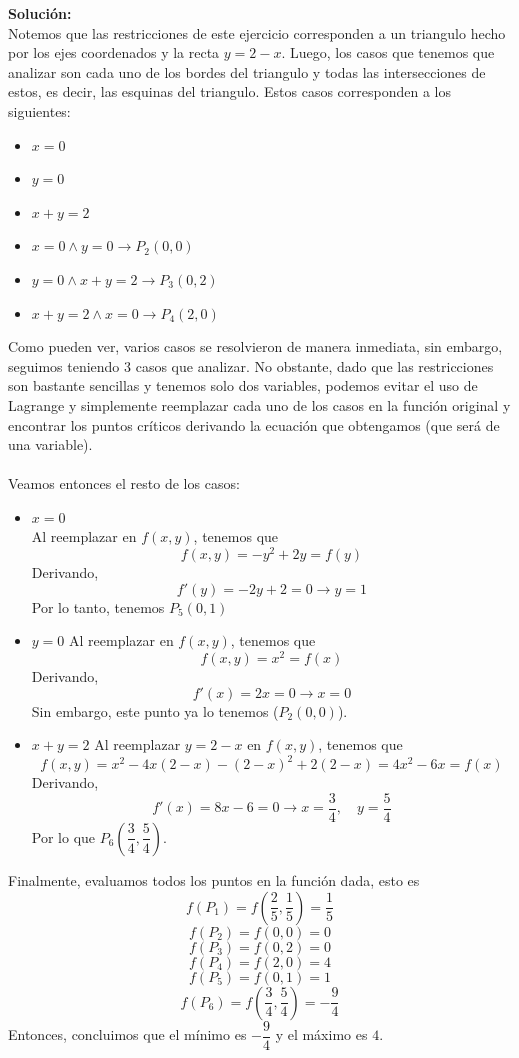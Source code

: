 \documentclass[12pt]{article}
\newenvironment{solucion}
{\begin{mdframed}[backgroundcolor=black!10]
		{\bf Solución:}\\
	}
	{
	\end{mdframed}
}
\newenvironment{preguntas}
{\begin{enumerate}\itemsep12pt
	}
	{
	\end{enumerate}
}
\newcommand{\ra}{\rightarrow}
\begin{document}
\begin{preguntas}
\begin{solucion}
Notemos que las restricciones de este ejercicio corresponden a un triangulo hecho por los ejes coordenados y la recta $y = 2-x$. Luego, los casos que tenemos que analizar son cada uno de los bordes del triangulo y todas las intersecciones de estos, es decir, las esquinas del triangulo. Estos casos corresponden a los siguientes:
\begin{itemize}
	\item $x = 0$
	\item $y = 0$
	\item $x + y = 2$
	\item $x = 0 \wedge y = 0 \ra P_2(0,0)$
	\item $y = 0 \wedge x + y = 2 \ra P_3(0,2)$
	\item $x + y = 2 \wedge x = 0 \ra P_4(2,0)$
\end{itemize}
Como pueden ver, varios casos se resolvieron de manera inmediata, sin embargo, seguimos teniendo 3 casos que analizar. No obstante, dado que las restricciones son bastante sencillas y tenemos solo dos variables, podemos evitar el uso de Lagrange y simplemente reemplazar cada uno de los casos en la función original y encontrar los puntos críticos derivando la ecuación que obtengamos (que será de una variable).\\
\\
Veamos entonces el resto de los casos:
\begin{itemize}
	\item $x = 0$\\
	Al reemplazar en $f(x,y)$, tenemos que
	$$f(x,y) = -y^2 + 2y = f(y)$$
	Derivando,
	$$f'(y) = -2y + 2 = 0 \ra y = 1$$
	Por lo tanto, tenemos $P_5(0,1)$
	\item $y = 0$
	Al reemplazar en $f(x,y)$, tenemos que
	$$f(x,y) = x^2 = f(x)$$
	Derivando,
	$$f'(x) = 2x = 0 \ra x = 0$$
	Sin embargo, este punto ya lo tenemos ($P_2(0,0)$).
	\item $x + y = 2$
	Al reemplazar $y = 2 - x$ en $f(x,y)$, tenemos que
	$$f(x,y) = x^2 - 4x(2-x) - (2-x)^2 + 2(2-x) = 4x^2 - 6x = f(x)$$
	Derivando,
	$$f'(x) = 8x - 6 = 0 \ra x = \dfrac{3}{4}, \quad y = \dfrac{5}{4}$$
	Por lo que $P_6\left(\dfrac{3}{4},\dfrac{5}{4}\right)$.
\end{itemize}
Finalmente, evaluamos todos los puntos en la función dada, esto es
$$f(P_1) = f\left(\dfrac{2}{5}, \dfrac{1}{5}\right) = \dfrac{1}{5}$$
$$f(P_2) = f(0,0) = 0$$
$$f(P_3) = f(0,2) = 0$$
$$f(P_4) = f(2,0) = 4$$
$$f(P_5) = f(0,1) = 1$$
$$f(P_6) = f\left(\dfrac{3}{4}, \dfrac{5}{4}\right) = -\dfrac{9}{4}$$
Entonces, concluimos que el mínimo es $-\dfrac{9}{4}$ y el máximo es $4$.

\end{solucion}
\end{preguntas}
\end{document}
